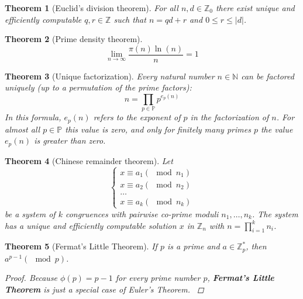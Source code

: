 \documentclass{book}
\newcommand{\fun}[2]{\ensuremath{#1\left(#2\right)}}
\newcommand{\term}[1]{{\bf #1}\index{#1}}
\newcommand{\NNN}{\ensuremath{\mathbb{N}}}
\newcommand{\PPP}{\ensuremath{\mathbb{P}}}
\newcommand{\ZZZ}{\ensuremath{\mathbb{Z}}}
\newtheorem{theo}{Theorem}
\begin{document}
\begin{theo}[Euclid's division theorem]
For all $n,d\in\ZZZ_0$ there exist unique and efficiently computable $q,r\in\ZZZ$ such that $n=qd+r$ and $0\leq r\leq\left|d\right|$.
\cite{Oppliger:2011:CC:2049860}
\end{theo}

\begin{theo}[Prime density theorem]
\begin{equation}
\displaystyle\lim_{n\rightarrow\infty}\displaystyle\frac{\pi\left(n\right)\ln\left(n\right)}{n}=1
\end{equation}
\cite{Oppliger:2011:CC:2049860}
\end{theo}

\begin{theo}[Unique factorization]
Every natural number $n\in\NNN$ can be factored uniquely (up to a permutation of the prime factors):
\begin{equation}
n=\displaystyle\prod_{p\in\PPP}{p^{\fun{e_p}{n}}}
\end{equation}
In this formula, $\fun{e_p}{n}$ refers to the exponent of $p$ in the factorization of $n$. For almost all $p\in\PPP$ this value is zero, and only for finitely many primes $p$ the value $\fun{e_p}{n}$ is greater than zero.
\cite{Oppliger:2011:CC:2049860}
\end{theo}

\begin{theo}[Chinese remainder theorem]
Let
\begin{equation}
\left\{\begin{array}{l}
x\equiv a_1\left(\mod n_1\right)\\
x\equiv a_2\left(\mod n_2\right)\\
\ldots\\
x\equiv a_k\left(\mod n_k\right)
\end{array}\right.
\end{equation}
be a system of $k$ congruences with pairwise co-prime moduli $n_1,\ldots,n_k$. The system has a unique and efficiently computable solution $x$ in $\ZZZ_n$ with $n=\prod_{i=1}^kn_i$.
\cite{Oppliger:2011:CC:2049860}
\end{theo}

\begin{theo}[Fermat's Little Theorem]
If $p$ is a prime and $a\in\ZZZ^*_p$, then $a^{p-1}\left(\mod p\right)$.
\begin{proof}
Because $\fun{\phi}{p}=p-1$ for every prime number $p$, \term{Fermat's Little Theorem} is just a special case of Euler's Theorem.
\cite{Oppliger:2011:CC:2049860}
\end{proof}
\end{theo}
\end{document}
